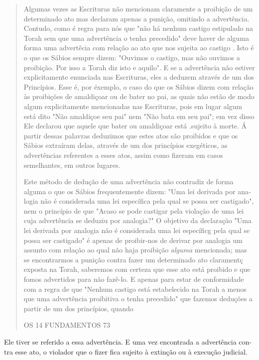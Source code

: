 \begin{quote}
Algumas vezes as Escrituras não mencionam claramente a proibição de um
determinado ato mas declaram apenas a punição, omitindo a advertên­cia.
Contudo, como é regra para nós que "não há nenhum castigo estipulado na
Torah sem que uma advertência o tenha precedido" deve haver de alguma
forma uma advertêcia com relação ao ato que nos sujeita ao castigo .
Isto é o que os Sábios sempre dizem: "Ouvimos o castigo, mas não ouvimos
a proibi­ção. Por isso a Torah diz isto e aquilo". E se a advertência
não estiver explicita­mente enunciada nas Escrituras, eles a deduzem
através de um dos Princípios. Esse é, por éxemplo, o caso do que os
Sábios dizem com relação às proibições de amaldiçoar ou de bater no pai,
as quais não estão de modo algum explicita­mente mencionadas nas
Escrituras, pois em lugar algum está dito "Não amaldi­çoe seu pai" nem
"Não bata em seu pai"; em vez disso Ele declarou que aquele que bater ou
amaldiçoar está .sujeito à morte. Á partir dessas palavras deduzi­mos
que estes atos são proibidos e que os Sábios extraíram delas, através de
um dos princípios exegéticos, as advertências referentes a esses atos,
assim co­mo fizeram em casos semelhantes, em outros lugares.

Este método de dedução de uma advertência não contradiz de for­ma alguma
o que os Sábios frequentemente dizem: "Uma lei derivada por ana­logia
não é considerada uma lei específica pela qual se possa ser castigado",
nem o princípio de que "Acaso se pode castigar pela violação de uma lei
cuja advertência se deduziu por analogia?" O objetivo da declaração "Uma
lei deri­vada por analogia não é considerada uma lei específicg pela
qual se possa ser castigado" é apenas de proibir-nos de derivar por
analogia um assunto com re­lação ao qual não haja proibição
\emph{alguma} mencionada; mas se encontrarmos a punição contra fazer um
determinado ato claramentç exposta na Torah, sabe­remos com certeza que
esse ato está proibido e que fomos advertidos para não fazê-lo. E apenas
para estar de conformidade com a regra de que "Nenhum cas­tigo está
estabelecido na Torah a menos que uma advertência proibitiva o te­nha
precedido" que fazemos deduções a partir de um dos princípios, quando

OS 14 FUNDAMENTOS 73
\end{quote}

Ele tiver se referido a essa advertência. E uma vez encontrada a
advertência con-\\
tra esse ato, o violador que o fizer fica sujeito à extinção ou à
execução judicial.

